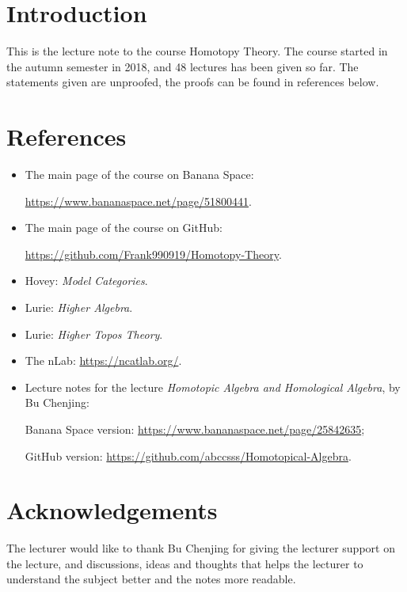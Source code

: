 \section*{Introduction}

This is the lecture note to the course Homotopy Theory. 
The course started in the autumn semester in 2018, and 48 lectures has been given so far.
The statements given are unproofed, the proofs can be found in references below.

\section*{References}

\begin{itemize}
\item The main page of the course on Banana Space: 

\url{https://www.bananaspace.net/page/51800441}.
\item The main page of the course on GitHub: 

\url{https://github.com/Frank990919/Homotopy-Theory}.
\item Hovey: \textit{Model Categories}.
\item Lurie: \textit{Higher Algebra}.
\item Lurie: \textit{Higher Topos Theory}.
\item The nLab: \url{https://ncatlab.org/}.
\item Lecture notes for the lecture \textit{Homotopic Algebra and Homological Algebra}, by Bu Chenjing:

Banana Space version: \url{https://www.bananaspace.net/page/25842635};

GitHub version: \url{https://github.com/abccsss/Homotopical-Algebra}.
\end{itemize}

\section*{Acknowledgements}

The lecturer would like to thank Bu Chenjing for giving the lecturer support on the lecture, and discussions, ideas and thoughts 
that helps the lecturer to understand the subject better and the notes more readable.